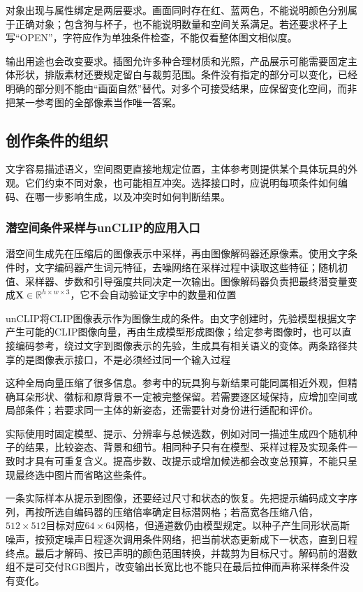对象出现与属性绑定是两层要求。画面同时存在红、蓝两色，不能说明颜色分别属于正确对象；包含狗与杯子，也不能说明数量和空间关系满足。若还要求杯子上写“OPEN”，字符应作为单独条件检查，不能仅看整体图文相似度。

输出用途也会改变要求。插图允许多种合理材质和光照，产品展示可能需要固定主体形状，排版素材还要规定留白与裁剪范围。条件没有指定的部分可以变化，已经明确的部分则不能由“画面自然”替代。对多个可接受结果，应保留变化空间，而非把某一参考图的全部像素当作唯一答案。

\subsection{创作条件的组织}
\label{sec:vision-generation-conditions}

文字容易描述语义，空间图更直接地规定位置，主体参考则提供某个具体玩具的外观。它们约束不同对象，也可能相互冲突。选择接口时，应说明每项条件如何编码、在哪一步影响生成，以及冲突时如何判断结果。

\subsubsection{潜空间条件采样与unCLIP的应用入口}
\label{sec:vision-generation-latent-entry}

潜空间生成先在压缩后的图像表示中采样，再由图像解码器还原像素。使用文字条件时，文字编码器产生词元特征，去噪网络在采样过程中读取这些特征；随机初值、采样器、步数和引导强度共同决定一次输出。图像解码器负责把最终潜变量变成$\bm{X}\in\mathbb{R}^{h\times w\times3}$，它不会自动验证文字中的数量和位置

unCLIP将CLIP图像表示作为图像生成的条件。由文字创建时，先验模型根据文字产生可能的CLIP图像向量，再由生成模型形成图像；给定参考图像时，也可以直接编码参考，绕过文字到图像表示的先验，生成具有相关语义的变体。两条路径共享的是图像表示接口，不是必须经过同一个输入过程

这种全局向量压缩了很多信息。参考中的玩具狗与新结果可能同属相近外观，但精确耳朵形状、徽标和原背景不一定被完整保留。若需要逐区域保持，应增加空间或局部条件；若要求同一主体的新姿态，还需要针对身份进行适配和评价。

实际使用时固定模型、提示、分辨率与总候选数，例如对同一描述生成四个随机种子的结果，比较姿态、背景和细节。相同种子只有在模型、采样过程及实现条件一致时才具有可重复含义。提高步数、改提示或增加候选都会改变总预算，不能只呈现最终选中图片而省略这些条件。

一条实际样本从提示到图像，还要经过尺寸和状态的恢复。先把提示编码成文字序列，再按所选自编码器的压缩倍率确定目标潜网格；若高宽各压缩八倍，$512\times512$目标对应$64\times64$网格，但通道数仍由模型规定。以种子产生同形状高斯噪声，按预定噪声日程逐次调用条件网络，把当前状态更新成下一状态，直到日程终点。最后才解码、按已声明的颜色范围转换，并裁剪为目标尺寸。解码前的潜数组不是可交付RGB图片，改变输出长宽比也不能只在最后拉伸而声称采样条件没有变化。

